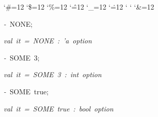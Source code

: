 \begin{list}{}
{\setlength{\leftmargin}{\leftmargini}
\setlength{\rightmargin}{0cm}
\setlength{\itemindent}{0cm}
\setlength{\listparindent}{0cm}
\setlength{\itemsep}{0cm}
\setlength{\parsep}{0cm}
\setlength{\labelsep}{0cm}
\setlength{\labelwidth}{0cm}
\catcode`\#=12
\catcode`\$=12
\catcode`\%=12
\catcode`\^=12
\catcode`\_=12
\catcode`\.=12
\catcode`
\catcode`
\catcode`\&=12
\ttfamily}
\small
\item[]\textsl{-\ }NONE;
\item[]\textsl{val\ it\ =\ NONE\ :\ 'a\ option}
\item[]\textsl{-\ }SOME\ 3;
\item[]\textsl{val\ it\ =\ SOME\ 3\ :\ int\ option}
\item[]\textsl{-\ }SOME\ true;
\item[]\textsl{val\ it\ =\ SOME\ true\ :\ bool\ option}
\end{list}
